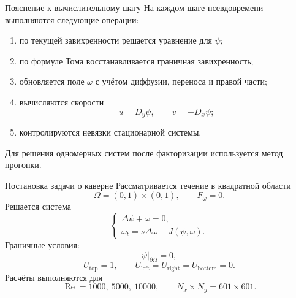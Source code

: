 \documentclass[aspectratio=169,10pt]{beamer}
\newcommand{\Reynolds}{\operatorname{Re}}
\newcommand{\Laplace}{\Delta}
\newcommand{\J}{J}
\begin{document}
\begin{frame}{Пояснение к вычислительному шагу}
    На каждом шаге псевдовремени выполняются следующие операции:
    \begin{enumerate}
        \item по текущей завихренности решается уравнение для \(\psi\);
        \item по формуле Тома восстанавливается граничная завихренность;
        \item обновляется поле \(\omega\) с учётом диффузии, переноса и правой части;
        \item вычисляются скорости
        \[
            u=D_y\psi,\qquad v=-D_x\psi;
        \]
        \item контролируются невязки стационарной системы.
    \end{enumerate}
    Для решения одномерных систем после факторизации используется метод прогонки.
\end{frame}

\begin{frame}{Постановка задачи о каверне}
    Рассматривается течение в квадратной области
    \[
        \Omega=(0,1)\times(0,1),
        \qquad
        F_\omega=0.
    \]
    Решается система
    \[
        \begin{cases}
        \Laplace\psi+\omega=0,\\
        \omega_t=\nu\Laplace\omega-\J(\psi,\omega).
        \end{cases}
    \]
    Граничные условия:
    \[
        \psi|_{\partial\Omega}=0,
    \]
    \[
        U_{\mathrm{top}}=1,\qquad
        U_{\mathrm{left}}=U_{\mathrm{right}}=U_{\mathrm{bottom}}=0.
    \]
    Расчёты выполняются для
    \[
        \Reynolds=1000,\ 5000,\ 10000,
        \qquad
        N_x\times N_y=601\times601.
    \]
\end{frame}
\end{document}
